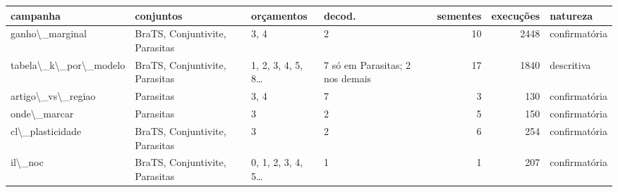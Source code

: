 \begin{tabular}{llllrrl}
\toprule
campanha & conjuntos & orçamentos & decod. & sementes & execuções & natureza \\
\midrule
ganho\textbackslash{}\_marginal & BraTS, Conjuntivite, Parasitas & 3, 4 & 2 & 10 & 2448 & confirmatória \\
tabela\textbackslash{}\_k\textbackslash{}\_por\textbackslash{}\_modelo & BraTS, Conjuntivite, Parasitas & 1, 2, 3, 4, 5, 8… & 7 só em Parasitas; 2 nos demais & 17 & 1840 & descritiva \\
artigo\textbackslash{}\_vs\textbackslash{}\_regiao & Parasitas & 3, 4 & 7 & 3 & 130 & confirmatória \\
onde\textbackslash{}\_marcar & Parasitas & 3 & 2 & 5 & 150 & confirmatória \\
cl\textbackslash{}\_plasticidade & BraTS, Conjuntivite, Parasitas & 3 & 2 & 6 & 254 & confirmatória \\
il\textbackslash{}\_noc & BraTS, Conjuntivite, Parasitas & 0, 1, 2, 3, 4, 5… & 1 & 1 & 207 & confirmatória \\
\bottomrule
\end{tabular}

